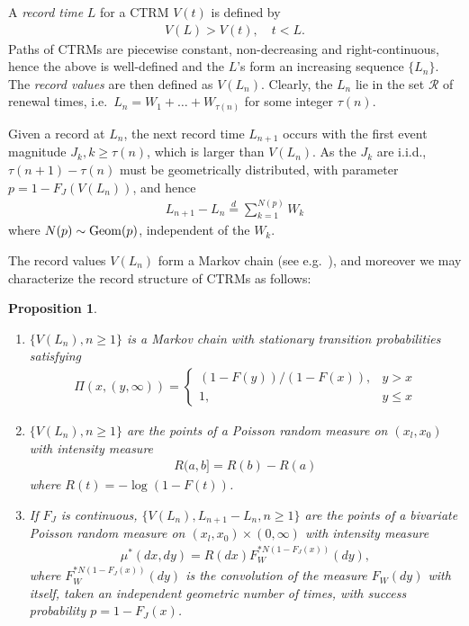 \documentclass[12pt]{article}
\newtheorem{proposition}[equation]{Proposition}
\newcommand{\1}{\mathbf 1}
\begin{document}
A \textit{record time} $L$ for a CTRM $V(t)$ is defined by 
\begin{align*}
V(L) > V(t), \quad t < L.
\end{align*}
Paths of CTRMs are piecewise constant, non-decreasing and right-continuous, hence the above is well-defined and the $L$'s form an increasing sequence $\{L_n\}$. The \textit{record values} are then defined as $V(L_n)$. Clearly, the $L_n$ lie in the set $\mathcal R$ of renewal times, i.e.\ $L_n = W_1 + \ldots + W_{\tau(n)}$ for some integer $\tau(n)$. 

Given a record at $L_n$, the next record time $L_{n+1}$ occurs with the first event magnitude $J_k, k \ge \tau(n)$, which is larger than $V(L_n)$. As the $J_k$ are i.i.d., $\tau(n+1) - \tau(n)$ must be geometrically distributed, with parameter $p = 1 - F_J(V(L_n))$, and hence 
\begin{align} \label{eq:geometric-sum}
L_{n+1} - L_n \stackrel{d}{=} \sum_{k=1}^{N(p)} W_k
\end{align}
where $N(p) \sim {\rm Geom}(p)$, independent of the $W_k$. 

The record values $V(L_n)$ form a Markov chain (see e.g.\ \cite{resnick2013extreme}), and moreover we may characterize the record structure of CTRMs as follows: 

\begin{proposition}
\begin{enumerate}
\item
$\{V(L_n), n \ge 1\}$ is a Markov chain with stationary transition probabilities satisfying
\begin{align*}
\Pi(x, (y,\infty)) = 
\begin{cases}
(1-F(y)) / (1-F(x)), & y > x
\\
1, & y \le x
\end{cases}
\end{align*}
\item
$\{V(L_n), n \ge 1\}$ are the points of a Poisson random measure on $(x_l, x_0)$ with intensity measure
\begin{align*}
R(a,b] = R(b) - R(a)
\end{align*}
where $R(t) = -\log(1-F(t))$. 
\item
If $F_J$ is continuous, $\{V(L_n), L_{n+1} - L_n, n \ge 1\}$ are the points of a bivariate Poisson random measure on
$(x_l, x_0) \times (0,\infty)$ with intensity measure
\begin{align*}
\mu^*(dx, dy) = R(dx) F_W^{*N(1-F_J(x))}(dy),
\end{align*}
where $F_W^{*N(1-F_J(x))}(dy)$ is the convolution of the measure $F_W(dy)$ with itself, taken an independent geometric number of times, with success probability $p = 1-F_J(x)$.
\end{enumerate}
\end{proposition}
\end{document}
